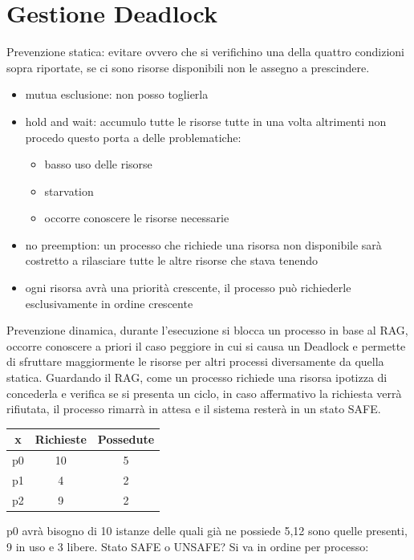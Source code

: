 \documentclass[a4paper, 12pt]{book}
\begin{document}
\section{Gestione Deadlock}

Prevenzione statica: evitare ovvero che si verifichino una della quattro condizioni sopra riportate,
se ci sono risorse disponibili non le assegno a prescindere.

\begin{itemize}
    \item mutua esclusione: non posso toglierla
    \item hold and wait: accumulo tutte le risorse tutte in una volta altrimenti non procedo
    questo porta a delle problematiche:
    \begin{itemize}
        \item basso uso delle risorse
        \item starvation
        \item occorre conoscere le risorse necessarie
    \end{itemize}
    \item no preemption: un processo che richiede una risorsa non disponibile
    sarà costretto a rilasciare tutte le altre risorse che stava tenendo
    \item ogni risorsa avrà una priorità crescente, il processo può richiederle esclusivamente in ordine crescente
\end{itemize}
Prevenzione dinamica, durante l'esecuzione si blocca un processo in base al RAG, occorre conoscere  a priori il caso peggiore 
in cui si causa un Deadlock e permette di sfruttare maggiormente le risorse per altri processi diversamente da quella statica.
Guardando il RAG, come un processo richiede una risorsa ipotizza di concederla e verifica se si presenta un ciclo,
in caso affermativo la richiesta verrà rifiutata, il processo rimarrà in attesa e il sistema resterà in 
un stato SAFE.

\vspace{3ex}
\begin{tabular}{|c|c|c|}
    \hline
    x & Richieste & Possedute \\
    \hline
    p0 & 10 & 5 \\
    \hline
    p1 & 4 & 2 \\
    \hline
    p2 & 9 & 2 \\
    \hline    
\end{tabular}

\vspace{3ex}p0 avrà bisogno di 10 istanze delle quali già ne possiede 5,12 sono quelle presenti, 9 in uso e 3 libere.
Stato SAFE o UNSAFE? Si va in ordine per processo:
\end{document}
